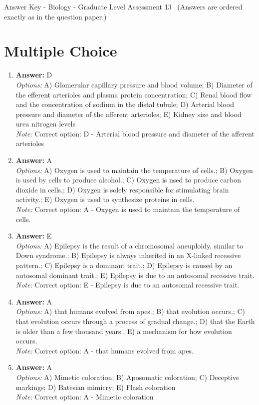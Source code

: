 \documentclass[12pt]{article}
\begin{document}
\begin{center}
Answer Key - Biology - Graduate Level Assessment 13 \
\small (Answers are ordered exactly as in the question paper.)
\end{center}

\section*{Multiple Choice}
\begin{enumerate}[label=\arabic*.]
\item \textbf{Answer:} D
\\ \textit{Options:} A) Glomerular capillary pressure and blood volume; B) Diameter of the efferent arterioles and plasma protein concentration; C) Renal blood flow and the concentration of sodium in the distal tubule; D) Arterial blood pressure and diameter of the afferent arterioles; E) Kidney size and blood urea nitrogen levels
\\ \textit{Note:} Correct option: D - Arterial blood pressure and diameter of the afferent arterioles
\item \textbf{Answer:} A
\\ \textit{Options:} A) Oxygen is used to maintain the temperature of cells.; B) Oxygen is used by cells to produce alcohol.; C) Oxygen is used to produce carbon dioxide in cells.; D) Oxygen is solely responsible for stimulating brain activity.; E) Oxygen is used to synthesize proteins in cells.
\\ \textit{Note:} Correct option: A - Oxygen is used to maintain the temperature of cells.
\item \textbf{Answer:} E
\\ \textit{Options:} A) Epilepsy is the result of a chromosomal aneuploidy, similar to Down syndrome.; B) Epilepsy is always inherited in an X-linked recessive pattern.; C) Epilepsy is a dominant trait.; D) Epilepsy is caused by an autosomal dominant trait.; E) Epilepsy is due to an autosomal recessive trait.
\\ \textit{Note:} Correct option: E - Epilepsy is due to an autosomal recessive trait.
\item \textbf{Answer:} A
\\ \textit{Options:} A) that humans evolved from apes.; B) that evolution occurs.; C) that evolution occurs through a process of gradual change.; D) that the Earth is older than a few thousand years.; E) a mechanism for how evolution occurs.
\\ \textit{Note:} Correct option: A - that humans evolved from apes.
\item \textbf{Answer:} A
\\ \textit{Options:} A) Mimetic coloration; B) Aposomatic coloration; C) Deceptive markings; D) Batesian mimicry; E) Flash coloration
\\ \textit{Note:} Correct option: A - Mimetic coloration
\end{enumerate}
\end{document}
